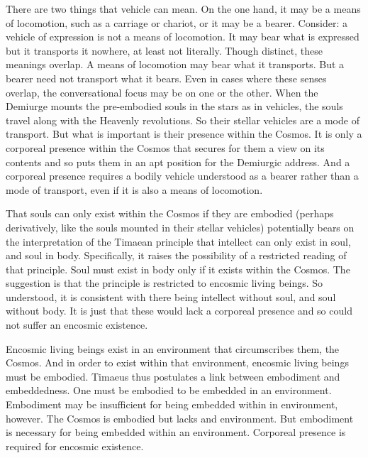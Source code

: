 There are two things that vehicle can mean. On the one hand, it may be a means of locomotion, such as a carriage or chariot, or it may be a bearer. Consider: a vehicle of expression is not a means of locomotion. It may bear what is expressed but it transports it nowhere, at least not literally. Though distinct, these meanings overlap. A means of locomotion may bear what it transports. But a bearer need not transport what it bears. Even in cases where these senses overlap, the conversational focus may be on one or the other. When the Demiurge mounts the pre-embodied souls in the stars as in vehicles, the souls travel along with the Heavenly revolutions. So their stellar vehicles are a mode of transport. But what is important is their presence within the Cosmos. It is only a corporeal presence within the Cosmos that secures for them a view on its contents and so puts them in an apt position for the Demiurgic address. And a corporeal presence requires a bodily vehicle understood as a bearer rather than a mode of transport, even if it is also a means of locomotion.

That souls can only exist within the Cosmos if they are embodied (perhaps derivatively, like the souls mounted in their stellar vehicles) potentially bears on the interpretation of the Timaean principle that intellect can only exist in soul, and soul in body. Specifically, it raises the possibility of a restricted reading of that principle. Soul must exist in body only if it exists within the Cosmos. The suggestion is that the principle is restricted to encosmic living beings. So understood, it is consistent with there being intellect without soul, and soul without body. It is just that these would lack a corporeal presence and so could not suffer an encosmic existence. 

Encosmic living beings exist in an environment that circumscribes them, the Cosmos. And in order to exist within that environment, encosmic living beings must be embodied. Timaeus thus postulates a link between embodiment and embeddedness. One must be embodied to be embedded in an environment. Embodiment may be insufficient for being embedded within in environment, however. The Cosmos is embodied but lacks and environment. But embodiment is necessary for being embedded within an environment. Corporeal presence is required for encosmic existence.

